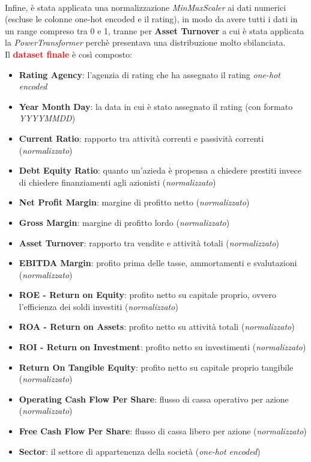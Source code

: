 \\ Infine, è stata applicata una normalizzazione \textit{MinMaxScaler} ai dati numerici (escluse le colonne one-hot encoded e il rating), in modo da avere tutti i dati in un range compreso tra 0 e 1, tranne per \textbf{Asset Turnover} a cui è stata applicata la \textit{PowerTransformer} perchè presentava una distribuzione molto sbilanciata. \\ Il \textcolor{red}{\textbf{dataset finale}} è così composto:
\begin{itemize}[label=-]
    \item \textbf{Rating Agency}: l'agenzia di rating che ha assegnato il rating \textit{one-hot encoded}
    \item \textbf{Year Month Day}: la data in cui è stato assegnato il rating (con formato \textit{YYYYMMDD})
    \item \textbf{Current Ratio}: rapporto tra attività correnti e passività correnti (\textit{normalizzato})
    \item \textbf{Debt Equity Ratio}: quanto un'azieda è propensa a chiedere prestiti invece di chiedere finanziamenti agli azionisti (\textit{normalizzato})
    \item \textbf{Net Profit Margin}: margine di profitto netto (\textit{normalizzato})
    \item \textbf{Gross Margin}: margine di profitto lordo (\textit{normalizzato})
    \item \textbf{Asset Turnover}: rapporto tra vendite e attività totali (\textit{normalizzato})
    \item \textbf{EBITDA Margin}: profito prima delle tasse, ammortamenti e svalutazioni (\textit{normalizzato})
    \item \textbf{ROE - Return on Equity}: profito netto su capitale proprio, ovvero l'efficienza dei soldi investiti (\textit{normalizzato})
    \item \textbf{ROA - Return on Assets}: profito netto su attività totali (\textit{normalizzato})
    \item \textbf{ROI - Return on Investment}: profito netto su investimenti (\textit{normalizzato})
    \item \textbf{Return On Tangible Equity}: profito netto su capitale proprio tangibile (\textit{normalizzato})
    \item \textbf{Operating Cash Flow Per Share}: flusso di cassa operativo per azione (\textit{normalizzato})
    \item \textbf{Free Cash Flow Per Share}: flusso di cassa libero per azione (\textit{normalizzato})
    \item \textbf{Sector}: il settore di appartenenza della società (\textit{one-hot encoded})
\end{itemize}
